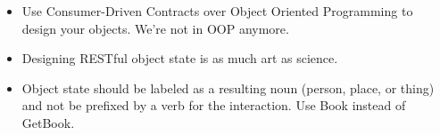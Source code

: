 \begin{itemize}
  \item Use Consumer-Driven Contracts over Object Oriented Programming to design your objects.  We're not in OOP anymore.
  \item Designing RESTful object state is as much art as science.
  \item Object state should be labeled as a resulting noun (person, place, or thing) and not be prefixed by a verb for the interaction.  Use Book instead of GetBook.
\end{itemize}





